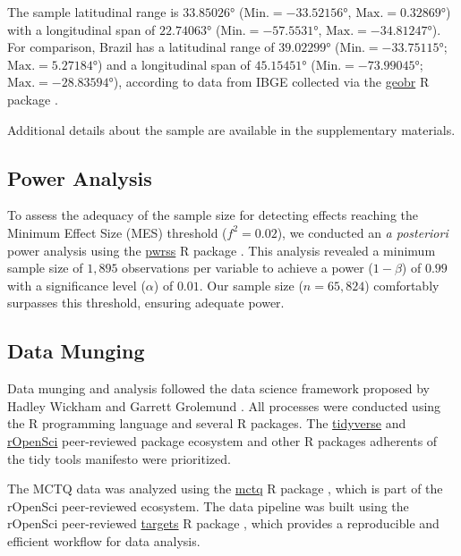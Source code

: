 \documentclass[
12pt,
openright,
oneside,
a4paper,
chapter=TITLE,
section=TITLE,
french,
spanish,
brazil,
english
]{abntex2}
\begin{document}
The sample latitudinal range is \(33.85026°\)
(\(\text{Min.} = -33.52156°\), \(\text{Max.} = 0.32869°\)) with a
longitudinal span of \(22.74063°\) (\(\text{Min.} = -57.5531°\),
\(\text{Max.} = -34.81247°\)). For comparison, Brazil has a latitudinal
range of \(39.02299°\) (\(\text{Min.} = -33.75115°\);
\(\text{Max.} = 5.27184°\)) and a longitudinal span of \(45.15451°\)
(\(\text{Min.} = -73.99045°\); \(\text{Max.} = -28.83594°\)), according
to data from IBGE collected via the
\href{https://ipeagit.github.io/geobr/index.html\%3E}{geobr} R package
\autocite{pereira}.

Additional details about the sample are available in the supplementary
materials.

\subsection{Power Analysis}\label{power-analysis}

To assess the adequacy of the sample size for detecting effects reaching
the Minimum Effect Size (MES) threshold (\(f^2 = 0.02\)), we conducted
an \emph{a posteriori} power analysis using the
\href{https://cran.r-project.org/web/packages/pwrss/vignettes/examples.html}{pwrss}
R package \autocite{bulus}. This analysis revealed a minimum sample size
of \(1,895\) observations per variable to achieve a power
(\(1 - \beta\)) of \(0.99\) with a significance level (\(\alpha\)) of
\(0.01\). Our sample size (\(n = 65,824\)) comfortably surpasses this
threshold, ensuring adequate power.

\subsection{Data Munging}\label{data-munging}

Data munging and analysis followed the data science framework proposed
by Hadley Wickham and Garrett Grolemund \autocite{wickham2023e}. All
processes were conducted using the R programming language
\autocite{rcoreteama} and several R packages. The
\href{https://www.tidyverse.org/}{tidyverse} and
\href{https://ropensci.org/}{rOpenSci} peer-reviewed package ecosystem
and other R packages adherents of the tidy tools manifesto
\autocite{wickham2023c} were prioritized.

The MCTQ data was analyzed using the
\href{https://docs.ropensci.org/mctq/}{mctq} R package
\autocite{vartanianh}, which is part of the rOpenSci peer-reviewed
ecosystem. The data pipeline was built using the rOpenSci peer-reviewed
\href{https://books.ropensci.org/targets/}{targets} R package
\autocite{landau2021a}, which provides a reproducible and efficient
workflow for data analysis.
\end{document}
